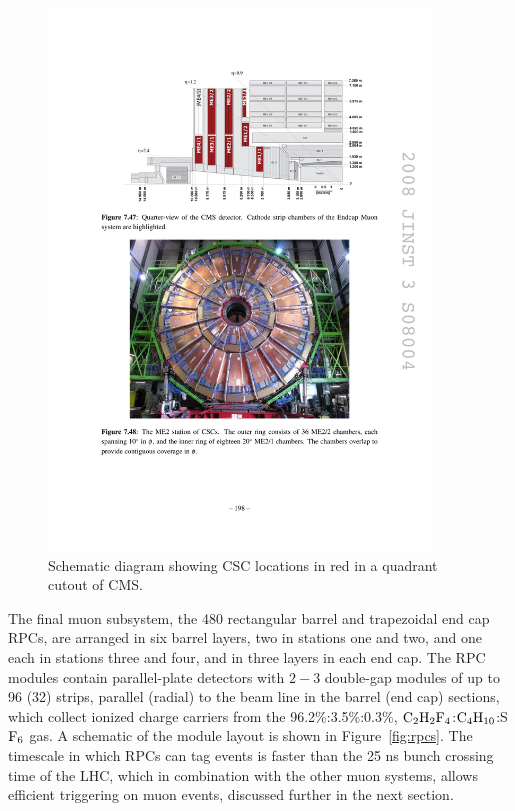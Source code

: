 \begin{figure}[tbh]
\centering
\includegraphics[width=4in]{figures/cscs.pdf}
\caption{Schematic diagram showing CSC locations in red in a quadrant cutout of CMS.}
\label{fig:cscs}
\end{figure}

The final muon subsystem, the 480 rectangular barrel and trapezoidal end cap RPCs, are arranged in six barrel layers, two in stations one and two, and one each in stations three and four, and in three layers in each end cap. The RPC modules contain parallel-plate detectors with $2-3$ double-gap modules of up to 96 (32) strips, parallel (radial) to the beam line in the barrel (end cap) sections, which collect ionized charge carriers from the 96.2\%:3.5\%:0.3\%, $\rm{C}_2\rm{H}_2\rm{F}_4$:$\rm{C}_4\rm{H}_{10}$:S$\rm{F}_6$ gas. A schematic of the module layout is shown in Figure~\ref{fig:rpcs}. The timescale in which RPCs can tag events is faster than the 25 ns bunch crossing time of the LHC, which in combination with the other muon systems, allows efficient triggering on muon events, discussed further in the next section.


